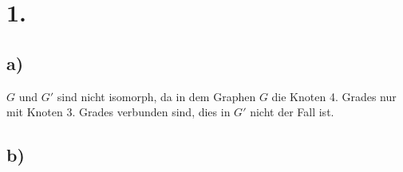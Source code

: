\documentclass[a4paper]{scrartcl}
\title{\titleinfo}
\author{Arne Struck 6326505}
\date{\today}
\begin{document}
\maketitle
\notag
\section{1.}
	\subsection{a)}		
		\(G\) und \(G'\) sind nicht isomorph, da in dem Graphen \(G\) die Knoten 4. Grades nur mit 
		Knoten 3. Grades verbunden sind, dies in \(G'\) nicht der Fall ist. \\
		
	\subsection{b)}
\end{document}
